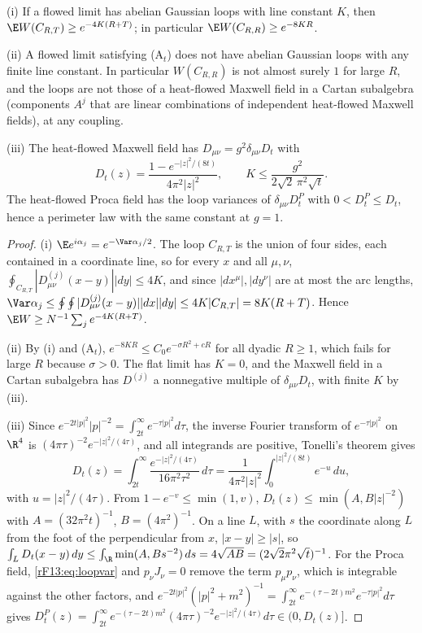 \begin{theorem}\label{rF13:area}
\textup{(i)} If a flowed limit has abelian Gaussian loops with line constant
$K$, then $\E W(C_{R,T})\ge e^{-4K(R+T)}$; in particular $\E W(C_{R,R})\ge e^{-8KR}$.

\textup{(ii)} A flowed limit satisfying \textup{(A$_t$)} does not have
abelian Gaussian loops with any finite line constant. In particular
$W(C_{R,R})$ is not almost surely $1$ for large $R$, and the loops are not
those of a heat-flowed Maxwell field in a Cartan subalgebra (components
$A^j$ that are linear combinations of independent heat-flowed Maxwell
fields), at any coupling.

\textup{(iii)} The heat-flowed Maxwell field has $D_{\mu\nu}=g^2\delta_{\mu\nu}
D_t$ with
\[
D_t(z)=\frac{1-e^{-|z|^2/(8t)}}{4\pi^2|z|^2},\qquad K\le\frac{g^2}{2\sqrt2\,
\pi^2\sqrt t} .
\]
The heat-flowed Proca field has the loop variances of $\delta_{\mu\nu}D^P_t$
with $0<D^P_t\le D_t$, hence a perimeter law with the same constant at
$g=1$.
\end{theorem}

\begin{proof}
(i) $\E e^{i\alpha_j}=e^{-\Var\alpha_j/2}$. The loop $C_{R,T}$ is the union of
four sides, each contained in a coordinate line, so for every $x$ and all
$\mu,\nu$, $\oint_{C_{R,T}}|D^{(j)}_{\mu\nu}(x-y)||dy|\le4K$, and since
$|dx^\mu|,|dy^\nu|$ are at most the arc lengths,
$\Var\alpha_j\le\oint\oint|D^{(j)}_{\mu\nu}(x-y)||dx||dy|\le4K|C_{R,T}|=8K(R+T)$.
Hence $\E W\ge N^{-1}\sum_je^{-4K(R+T)}$.

(ii) By (i) and (A$_t$), $e^{-8KR}\le C_0e^{-\sigma R^2+cR}$ for all dyadic
$R\ge1$, which fails for large $R$ because $\sigma>0$. The flat limit has
$K=0$, and the Maxwell field in a Cartan subalgebra has $D^{(j)}$ a
nonnegative multiple of $\delta_{\mu\nu}D_t$, with finite $K$ by (iii).

(iii) Since $e^{-2t|p|^2}|p|^{-2}=\int_{2t}^\infty e^{-\tau|p|^2}d\tau$, the
inverse Fourier transform of $e^{-\tau|p|^2}$ on $\R^4$ is $(4\pi\tau)^{-2}
e^{-|z|^2/(4\tau)}$, and all integrands are positive, Tonelli's theorem gives
\[
D_t(z)=\int_{2t}^\infty\frac{e^{-|z|^2/(4\tau)}}{16\pi^2\tau^2}\,d\tau
=\frac1{4\pi^2|z|^2}\int_0^{|z|^2/(8t)}e^{-u}\,du ,
\]
with $u=|z|^2/(4\tau)$. From $1-e^{-v}\le\min(1,v)$, $D_t(z)\le\min(A,B|z|^{-2})$
with $A=(32\pi^2t)^{-1}$, $B=(4\pi^2)^{-1}$. On a line $L$, with $s$ the
coordinate along $L$ from the foot of the perpendicular from $x$, $|x-y|\ge
|s|$, so $\int_LD_t(x-y)\,dy\le\int_\R\min(A,Bs^{-2})\,ds=4\sqrt{AB}=(2\sqrt2
\pi^2\sqrt t)^{-1}$. For the Proca field, \eqref{rF13:eq:loopvar} and
$p_\nu J_\nu=0$ remove the term $p_\mu p_\nu$, which is integrable against the
other factors, and $e^{-2t|p|^2}(|p|^2+m^2)^{-1}=\int_{2t}^\infty e^{-(\tau-2t)
m^2}e^{-\tau|p|^2}d\tau$ gives $D^P_t(z)=\int_{2t}^\infty e^{-(\tau-2t)m^2}(4\pi
\tau)^{-2}e^{-|z|^2/(4\tau)}d\tau\in(0,D_t(z)]$.
\end{proof}

